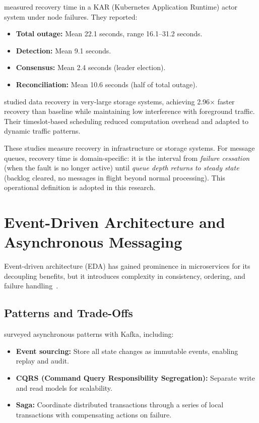 \citet{Sreepathy2021ReliableActors} measured recovery time in a KAR (Kubernetes Application Runtime) actor system under node failures. They reported:
\begin{itemize}
    \item \textbf{Total outage:} Mean 22.1 seconds, range 16.1–31.2 seconds.
    \item \textbf{Detection:} Mean 9.1 seconds.
    \item \textbf{Consensus:} Mean 2.4 seconds (leader election).
    \item \textbf{Reconciliation:} Mean 10.6 seconds (half of total outage).
\end{itemize}

\citet{Wang2019Dayu} studied data recovery in very-large storage systems, achieving 2.96× faster recovery than baseline while maintaining low interference with foreground traffic. Their timeslot-based scheduling reduced computation overhead and adapted to dynamic traffic patterns.

These studies measure recovery in infrastructure or storage systems. For message queues, recovery time is domain-specific: it is the interval from \emph{failure cessation} (when the fault is no longer active) until \emph{queue depth returns to steady state} (backlog cleared, no messages in flight beyond normal processing). This operational definition is adopted in this research.

\section{Event-Driven Architecture and Asynchronous Messaging}

Event-driven architecture (EDA) has gained prominence in microservices for its decoupling benefits, but it introduces complexity in consistency, ordering, and failure handling~\citep{Thaur2023EventDrivenKafka, Laigner2024EventChallenges}.

\subsection{Patterns and Trade-Offs}

\citet{Thaur2023EventDrivenKafka} surveyed asynchronous patterns with Kafka, including:
\begin{itemize}
    \item \textbf{Event sourcing:} Store all state changes as immutable events, enabling replay and audit.
    \item \textbf{CQRS (Command Query Responsibility Segregation):} Separate write and read models for scalability.
    \item \textbf{Saga:} Coordinate distributed transactions through a series of local transactions with compensating actions on failure.
\end{itemize}

